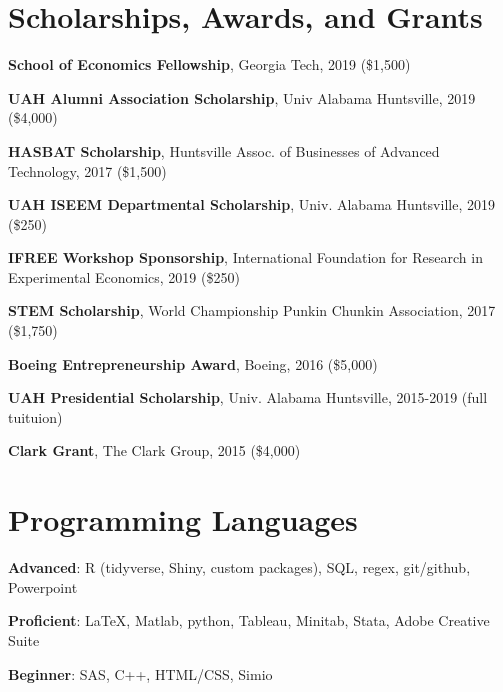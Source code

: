 \documentclass[margin,line]{res}
\begin{document}
\begin{resume}
\vspace{.75cm}
\section{\sc Scholarships, Awards, and Grants} 

{\bf School of Economics Fellowship}, Georgia Tech, 2019 (\$1,500)
\vspace*{-3.5mm}

{\bf UAH Alumni Association Scholarship}, Univ Alabama Huntsville, 2019 (\$4,000)
\vspace*{-3.5mm}

{\bf HASBAT Scholarship}, Huntsville Assoc. of Businesses of Advanced Technology, 2017 (\$1,500)
\vspace*{-3.5mm}

{\bf UAH ISEEM Departmental Scholarship}, Univ. Alabama Huntsville, 2019 (\$250)
\vspace*{-3.5mm}

{\bf IFREE Workshop Sponsorship}, International Foundation for Research in Experimental Economics, 2019 (\$250)
\vspace*{-3.5mm}

{\bf STEM Scholarship}, World Championship Punkin Chunkin Association, 2017 (\$1,750)
\vspace*{-3.5mm}

{\bf Boeing Entrepreneurship Award}, Boeing, 2016 (\$5,000)
\vspace*{-3.5mm}

{\bf UAH Presidential Scholarship}, Univ. Alabama Huntsville, 2015-2019 (full tuituion)
\vspace*{-3.5mm}

{\bf Clark Grant}, The Clark Group, 2015 (\$4,000)
\vspace*{-3.5mm}




\vspace{.75cm}
\section{\sc Programming Languages} 
{\bf Advanced}:  R (tidyverse, Shiny, custom packages), SQL, regex, git/github, Powerpoint
\vspace*{-3mm}

{\bf Proficient}:  \LaTeX, Matlab, python, Tableau, Minitab, Stata, Adobe Creative Suite
\vspace*{-3mm}

{\bf Beginner}:  SAS, C++, HTML/CSS, Simio
\vspace*{-3mm}


\end{resume}
\end{document}
